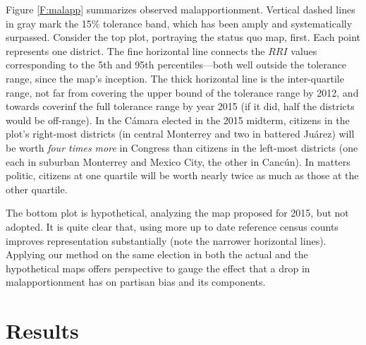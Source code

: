 \documentclass[letter,12pt]{article}
\begin{document}
{Figure \ref{F:malapp} summarizes observed malapportionment. Vertical dashed lines in gray mark the 15\% tolerance band, which has been amply and systematically surpassed. Consider the top plot, portraying the status quo map, first. Each point represents one district. The fine horizontal line connects the $RRI$ values corresponding to the 5th and 95th percentiles---both well outside the tolerance range, since the map's inception. The thick horizontal line is the inter-quartile range, not far from covering the upper bound of the tolerance range by 2012, and towards coverinf the full tolerance range by year 2015 (if it did, half the districts would be off-range). In the C\'amara elected in the 2015 midterm, citizens in the plot's right-most districts (in central Monterrey and two in battered Ju\'arez) will be worth \emph{four times more} in Congress than citizens in the left-most districts (one each in suburban Monterrey and Mexico City, the other in Canc\'un). In matters politic, citizens at one quartile will be worth nearly twice as much as those at the other quartile. 

The bottom plot is hypothetical, analyzing the map proposed for 2015, but not adopted. It is quite clear that, using more up to date reference census counts improves representation substantially (note the narrower horizontal lines). Applying our method on the same election in both the actual and the hypothetical maps offers perspective to gauge the effect that a drop in malapportionment has on partisan bias and its components. 

\section{Results}\label{S:results}

}
\end{document}
